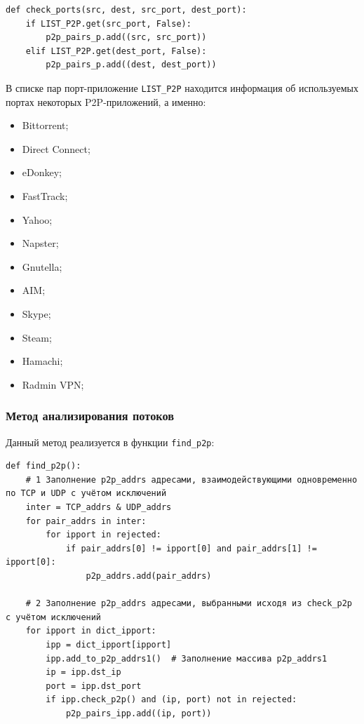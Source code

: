 \documentclass[bachelor, och, coursework]{SCWorks}
\begin{document}
\begin{verbatim}
def check_ports(src, dest, src_port, dest_port):
    if LIST_P2P.get(src_port, False):
        p2p_pairs_p.add((src, src_port))
    elif LIST_P2P.get(dest_port, False):
        p2p_pairs_p.add((dest, dest_port))
\end{verbatim}

В списке пар порт-приложение \texttt{LIST_P2P} находится информация об используемых портах некоторых P2P-приложений, а именно:

\begin{itemize}
    \item Bittorrent;
    \item Direct Connect;
    \item eDonkey;
    \item FastTrack;
    \item Yahoo;
    \item Napster;
    \item Gnutella;
    \item AIM;
    \item Skype;
    \item Steam;
    \item Hamachi;
    \item Radmin VPN;
\end{itemize}

\subsubsection{Метод анализирования потоков}
Данный метод реализуется в функции \texttt{find_p2p}:

\begin{verbatim}
def find_p2p():
    # 1 Заполнение p2p_addrs адресами, взаимодействующими одновременно по TCP и UDP с учётом исключений
    inter = TCP_addrs & UDP_addrs
    for pair_addrs in inter:
        for ipport in rejected:
            if pair_addrs[0] != ipport[0] and pair_addrs[1] != ipport[0]:
                p2p_addrs.add(pair_addrs)

    # 2 Заполнение p2p_addrs адресами, выбранными исходя из check_p2p с учётом исключений
    for ipport in dict_ipport:
        ipp = dict_ipport[ipport]
        ipp.add_to_p2p_addrs1()  # Заполнение массива p2p_addrs1
        ip = ipp.dst_ip
        port = ipp.dst_port
        if ipp.check_p2p() and (ip, port) not in rejected:
            p2p_pairs_ipp.add((ip, port))
\end{verbatim}
\end{document}
